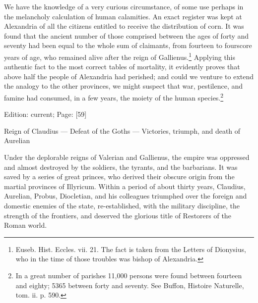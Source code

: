 We have the knowledge of a very curious circumstance, of some use perhaps in the melancholy calculation of human calamities. An exact register was kept at Alexandria of all the citizens entitled to receive the distribution of corn. It was found that the ancient number of those comprised between the ages of forty and seventy had been equal to the whole sum of claimants, from fourteen to fourscore years of age, who remained alive after the reign of Gallienus.\footnote{Euseb. Hist. Eccles. vii. 21. The fact is taken from the Letters of Dionysius, who in the time of those troubles was bishop of Alexandria.} Applying this authentic fact to the most correct tables of mortality, it evidently proves that above half the people of Alexandria had perished; and could we venture to extend the analogy to the other provinces, we might suspect that war, pestilence, and famine had consumed, in a few years, the moiety of the human species.\footnote{In a great number of parishes 11,000 persons were found between fourteen and eighty; 5365 between forty and seventy. See Buffon, Histoire Naturelle, tom. ii. p. 590.}

Edition: current; Page: [59]


Reign of Claudius \texthebrew{—} Defeat of the Goths \texthebrew{—} Victories, triumph, and death of Aurelian

Under the deplorable reigns of Valerian and Gallienus, the empire was oppressed and almost destroyed by the soldiers, the tyrants, and the barbarians. It was saved by a series of great princes, who derived their obscure origin from the martial provinces of Illyricum. Within a period of about thirty years, Claudius, Aurelian, Probus, Diocletian, and his colleagues triumphed over the foreign and domestic enemies of the state, re-established, with the military discipline, the strength of the frontiers, and deserved the glorious title of Restorers of the Roman world.

